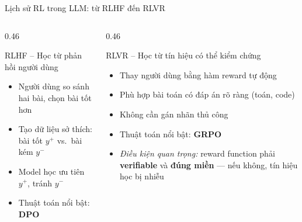 \begin{frame}[t]{Lịch sử RL trong LLM: từ RLHF đến RLVR}
  \vspace{0.3cm}
  \begin{columns}[T,onlytextwidth]
    \begin{column}{0.46\textwidth}
      \begin{block}{RLHF -- Học từ phản hồi người dùng}
        \small
        \begin{itemize}
          \item Người dùng so sánh hai bài, chọn bài tốt hơn
          \item Tạo dữ liệu sở thích: bài tốt $y^+$ vs.\ bài kém $y^-$
          \item Model học ưu tiên $y^+$, tránh $y^-$
          \item Thuật toán nổi bật: \textbf{DPO}
        \end{itemize}
      \end{block}
    \end{column}
    \begin{column}{0.46\textwidth}
      \begin{block}{RLVR -- Học từ tín hiệu có thể kiểm chứng}
        \small
        \begin{itemize}
          \item Thay người dùng bằng hàm reward tự động
          \item Phù hợp bài toán có đáp án rõ ràng (toán, code)
          \item Không cần gán nhãn thủ công
          \item Thuật toán nổi bật: \textbf{GRPO}
          \item \textit{\color{bkblue}Điều kiện quan trọng:} reward function phải \textbf{verifiable} và \textbf{đúng miền} --- nếu không, tín hiệu học bị nhiễu
        \end{itemize}
      \end{block}
    \end{column}
  \end{columns}

  \vspace{0.5cm}
  \centering
\end{frame}
